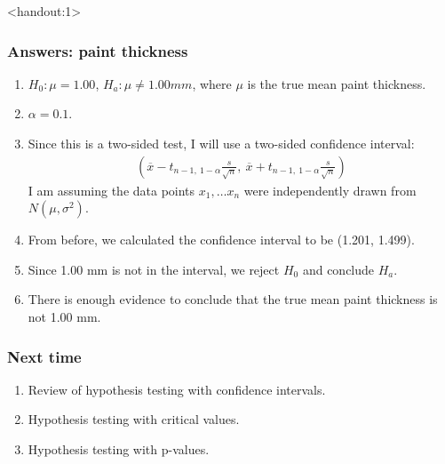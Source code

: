 \documentclass[handout]{beamer}\usepackage[]{graphicx}\usepackage[]{color}
\newcommand{\answers}{1}
\providecommand{\ov}[1]{\overline{#1}}
\numberwithin{equation}{section}
\begin{document}
\begin{frame}<handout:\answers>
\frametitle{Answers: paint thickness} \small
\begin{enumerate}[1. ]
\item $H_0: \mu = 1.00$, $H_a: \mu \ne 1.00 mm$, where $\mu$ is the true mean paint thickness. 
\pause \item $\alpha = 0.1$.
\pause \item Since this is a two-sided test, I will use a two-sided confidence interval:
\pause \begin{align*}
\left (\ov{x} - t_{n - 1 , \ 1 - \alpha} \frac{s}{\sqrt{n}}, \ \ov{x} + t_{n - 1 , \ 1 - \alpha} \frac{s}{\sqrt{n}} \right)
\end{align*}
I am assuming the data points $x_1, \ldots x_n$ were independently drawn from $N(\mu, \sigma^2)$.
\pause \item From before, we calculated the confidence interval to be (1.201, 1.499).
\pause \item Since 1.00 mm is not in the interval, we reject $H_0$ and conclude $H_a$.
\pause \item There is enough evidence to conclude that the true mean paint thickness is not 1.00 mm.
\end{enumerate}
\end{frame}

\begin{frame}
\frametitle{Next time}
\begin{enumerate}[1. ]
\item Review of hypothesis testing with confidence intervals.
\pause \item Hypothesis testing with critical values. 
\pause \item Hypothesis testing with p-values.
\end{enumerate}
\end{frame}
\end{document}
